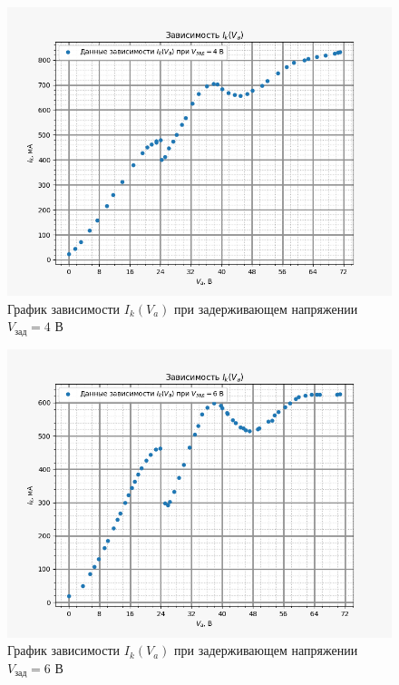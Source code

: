     \begin{figure}[H]
        \centering
        \includegraphics[width = 12 cm]{images/V_th_4_static}
        \caption{График зависимости $I_k(V_a)$ при задерживающем напряжении $V_{\text{зад}} = 4$ В}
        \label{fig:vth4_static}
    \end{figure}

    \begin{figure}[H]
        \centering
        \includegraphics[width = 12 cm]{images/V_th_6_static}
        \caption{График зависимости $I_k(V_a)$ при задерживающем напряжении $V_{\text{зад}} = 6$ В}
        \label{fig:vth6_static}
    \end{figure}

